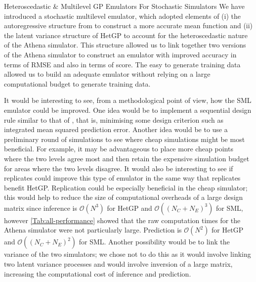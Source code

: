 \begin{chapter}{Heteroscedastic \& Multilevel GP Emulators For Stochastic Simulators\label{Ch:Hetsml}}
We have introduced a stochastic multilevel emulator, which adopted elements of (i) the autoregressive structure from \cite{Kennedy2000} to construct a more accurate mean function and (ii) the latent variance structure of HetGP \citep{Goldberg1998, Binois2018} to account for the heteroscedastic nature of the Athena simulator. This structure allowed us to link together two versions of the Athena simulator to construct an emulator with improved accuracy in terms of RMSE and also in terms of score. The easy to generate training data allowed us to build an adequate emulator without relying on a large computational budget to generate training data.

It would be interesting to see, from a methodological point of view, how the SML emulator could be improved. One idea would be to implement a sequential design rule similar to that of \citet{Gratiet2015}, that is, minimising some design criterion such as integrated mean squared prediction error. Another idea would be to use a preliminary round of simulations to see where cheap simulations might be most beneficial. For example, it may be advantageous to place more cheap points where the two levels agree most and then retain the expensive simulation budget for areas where the two levels disagree. It would also be interesting to see if replicates could improve this type of emulator in the same way that replicates benefit HetGP. Replication could be especially beneficial in the cheap simulator; this would help to reduce the size of computational overheads of a large design matrix since inference is $\mathcal{O}(N^3)$ for HetGP and $\mathcal{O}\left((N_C+N_E)^3\right)$ for SML, however \cref{Tab:all-performance} showed that the raw computation times for the Athena simulator were not particularly large. Prediction is $\mathcal{O}\left(N^2\right)$ for HetGP and $\mathcal{O}\left((N_C+N_E)^2\right)$ for SML. Another possibility would be to link the variance of the two simulators; we chose not to do this as it would involve linking two latent variance processes and would involve inversion of a large matrix, increasing the computational cost of inference and prediction.


\end{chapter}
